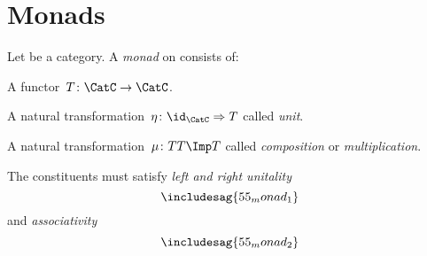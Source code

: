 

\section{Monads}

\begin{ctdefinition}[Monad]
  Let \CatC be a category. A \emph{monad} on \CatC consists of:
  \begin{compactenum}
    \item A functor~$T \colon \CatC \to \CatC$.
    \item A natural transformation~$\eta \colon \id_\CatC \Rightarrow T$ called \emph{unit}.
    \item A natural transformation~$\mu\colon TT\Imp T$ called \emph{composition} or \emph{multiplication}.
  \end{compactenum}
  The constituents must satisfy \emph{left and right unitality}
  \begin{equation}
    \includesag{55_monad_1}
  \end{equation}
  and \emph{associativity}
  \begin{equation}
    \includesag{55_monad_2}
  \end{equation}
\end{ctdefinition}
